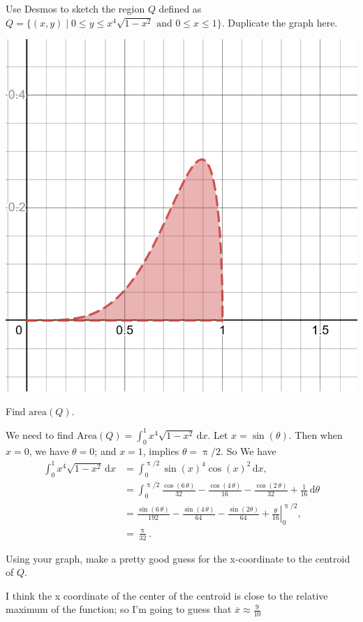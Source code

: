 \documentclass[12pt,fleqn,answers]{exam}
\begin{document}
\begin{questions}

    \question[2]  Use Desmos to sketch the region $Q$ defined as $Q = \{(x,y) \mid 0 \leq y \leq x^4 \sqrt{1-x^2}
    \mbox{ and } 0 \leq x \leq 1 \}$. Duplicate
    the graph here.
    \begin{solution}[2.0in]
      \includegraphics[scale=0.2]{desmos-graph(60).png}
    \end{solution}
    
    \question[2] Find $\mbox{area}(Q)$.
  \begin{solution}%
    We need to find $\text{Area}(Q) = \int_0^1 x^4 \sqrt{1-x^2} \, \mathrm{d} x$.
    Let $x = \sin(\theta)$. Then when $x = 0$, we have $\theta=0$;
    and $x = 1$, implies $\theta = \uppi/2$. So
    We have
    \begin{align*}
    \int_0^1 x^4 \sqrt{1-x^2} \, \mathrm{d} x &= \int_0^{\uppi/2} \sin(x)^4 \cos(x)^2 \, \mathrm{d} x, \\
                &= \int_0^{\uppi/2}  \frac{\cos{\left( 6  \, \theta \right) }}{32}-\frac{\cos{\left( 4   \,\theta \right) }}{16}-\frac{\cos{\left( 2  \, \theta \right) }}{32}+\frac{1}{16} \, \mathrm{d} \theta \\
                &= \left. \frac{\sin{\left( 6 \, \theta \right) }}{192}-\frac{\sin{\left( 4   \,\theta \right) }}{64}-\frac{\sin{\left( 2 \theta \right) }}{64}+\frac{\theta }{16} \right |_0^{\uppi/2}, \\
                &= \frac{\uppi}{32}.
  \end{align*}
    \end{solution}
        \question[2] Using your graph, make a pretty good guess for the x-coordinate to the centroid of $Q$.
  \begin{solution}[1.0in]
    I think the x coordinate of the center of the centroid is close to 
    the relative maximum of the function; so I'm going to guess that
    $\overline{x} \approx \frac{9}{10}$
   

\end{solution}
\end{questions}
\end{document}
